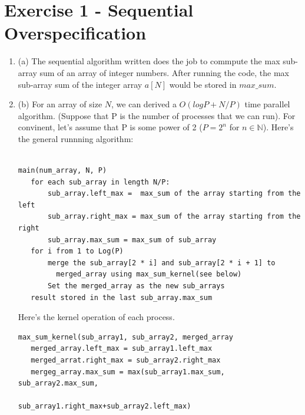 \documentclass[a4paper, 14pt]{article}
\begin{document}
\section{Exercise 1 - Sequential Overspecification}
\begin{enumerate}
\item{(a)} The sequential algorithm written does the job to commpute
  the max sub-array sum of an array of integer numbers. After running
  the code, the max sub-array sum of the integer array $a[N]$ would be
  stored in $max\_sum$.
\item{(b)} For an array of size $N$, we can derived a $O(log P + N/P)$ time
  parallel algorithm. (Suppose that P is the number of processes that
  we can run). For convinent, let's assume that P is some power of 2
  ($P = 2^n$ for $n \in \mathbb{N}$). Here's the general runnning
  algorithm:\\
\begin{verbatim}

main(num_array, N, P)
   for each sub_array in length N/P:
       sub_array.left_max =  max_sum of the array starting from the left
       sub_array.right_max = max_sum of the array starting from the right
       sub_array.max_sum = max_sum of sub_array
   for i from 1 to Log(P)
       merge the sub_array[2 * i] and sub_array[2 * i + 1] to
         merged_array using max_sum_kernel(see below)
       Set the merged_array as the new sub_arrays
   result stored in the last sub_array.max_sum
\end{verbatim}
Here's the kernel operation of
  each process.\\
\begin{verbatim}
max_sum_kernel(sub_array1, sub_array2, merged_array
   merged_array.left_max = sub_array1.left_max
   merged_arrat.right_max = sub_array2.right_max
   mergeg_array.max_sum = max(sub_array1.max_sum, sub_array2.max_sum,
                               sub_array1.right_max+sub_array2.left_max)
\end{verbatim}
\end{enumerate}
\end{document}
